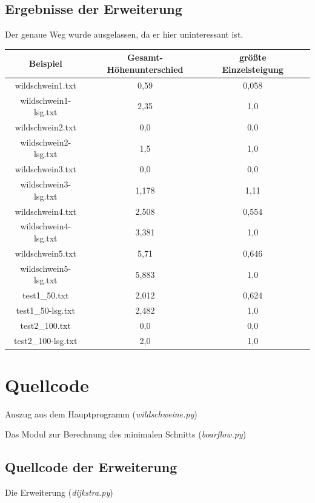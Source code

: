 \documentclass[a4paper, notitlepage, 12pt]{scrartcl}
\newenvironment{longlisting}{\captionsetup{type=listing}}{}
\begin{document}
\subsection{Ergebnisse der Erweiterung}
Der genaue Weg wurde ausgelassen, da er hier uninteressant ist.
\begin{table}[H]
    \begin{tabular}{|c|c|c|c|} 
    \hline
Beispiel & Gesamt-Höhenunterschied & größte Einzelsteigung \\ \hline
wildschwein1.txt & 0,59 & 0,058 \\
wildschwein1-lsg.txt & 2,35 & 1,0 \\
wildschwein2.txt & 0,0 & 0,0  \\
wildschwein2-lsg.txt & 1,5 & 1,0  \\
wildschwein3.txt & 0,0 & 0,0 \\
wildschwein3-lsg.txt & 1,178 & 1,11  \\
wildschwein4.txt & 2,508 & 0,554 \\
wildschwein4-lsg.txt & 3,381 & 1,0  \\
wildschwein5.txt & 5,71 & 0,646 \\
wildschwein5-lsg.txt & 5,883 & 1,0 \\
test1\_50.txt & 2,012 & 0,624 \\
test1\_50-lsg.txt & 2,482 & 1,0 \\
test2\_100.txt & 0,0 & 0,0 \\
test2\_100-lsg.txt & 2,0 & 1,0 \\ \hline
    \end{tabular}
\end{table}
 \section{Quellcode}
 \renewcommand{\listingscaption}{Quellcode}
 
 \begin{longlisting}
 \caption{Auszug aus dem Hauptprogramm (\textit{wildschweine.py})}
 \end{longlisting}
 
 \begin{longlisting}
 \caption{Das Modul zur Berechnung des minimalen Schnitts (\textit{boarflow.py})}
 \end{longlisting}
 
 \subsection{Quellcode der Erweiterung}
 \begin{longlisting}
 \caption{Die Erweiterung (\textit{dijkstra.py})}
 \end{longlisting}
 
\end{document}
